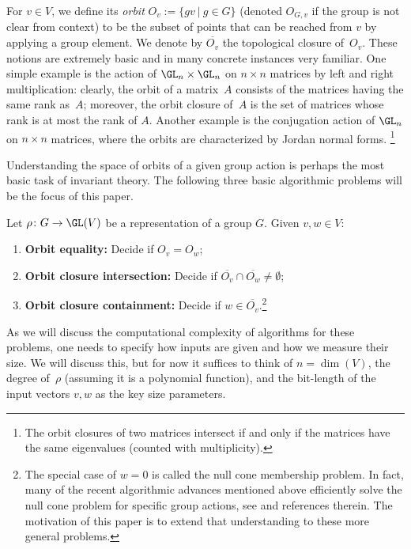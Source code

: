 For $v \in V$, we define its {\em orbit} $O_v := \{gv \ |\ g \in G\}$ (denoted $O_{G,v}$ if the group is not clear from context) to be the
subset of points that can be reached from $v$ by applying a group element.
We denote by $\overline{O_v}$ the topological closure of~$O_v$.
These notions are extremely basic and in many concrete instances very familiar.
One simple example is the action of $\GL_n \times \GL_n$ on $n \times n$ matrices by left and right multiplication:
clearly, the orbit of a matrix~$A$ consists of the matrices having the same rank as~$A$;
moreover, the orbit closure of~$A$ is the set of matrices whose rank is at most the rank of $A$.
Another example is the conjugation action of $\GL_n$ on $n \times n$ matrices, where the orbits are characterized by Jordan normal forms.
\footnote{The orbit closures of two matrices intersect if and only if the matrices have the same eigenvalues (counted with multiplicity).}

Understanding the space of orbits of a given group action is perhaps the most basic task of invariant theory. The following three basic algorithmic problems will be the focus of this paper.

\begin{problem}\label{prob:main}
Let $\rho \colon G \rightarrow \GL(V)$ be a representation of a group $G$. Given $v,w \in V$:
\begin{enumerate}
\item \textbf{Orbit equality:} Decide if $O_v = O_w$;
\item\label{prob:oci} \textbf{Orbit closure intersection:} Decide if $\overline{O_v} \cap \overline{O_w} \ne \emptyset$;
\item \textbf{Orbit closure containment:} Decide if $w \in \overline{O_v}$.\footnote{The special case of $w = 0$ is called the null cone membership problem. In fact, many of the recent algorithmic advances mentioned above efficiently solve the null cone problem for specific group actions, see \cite{BFGOWW2} and references therein. The motivation of this paper is to extend that understanding to these more general problems.}
\end{enumerate}
\end{problem}

As we will discuss the computational complexity of algorithms for these problems, one needs to specify how inputs are given and how we measure their size.
We will discuss this, but for now it suffices to think of $n=\dim(V)$, the degree of~$\rho$ (assuming it is a polynomial function), and the bit-length of the input vectors $v,w$ as the key size parameters.


